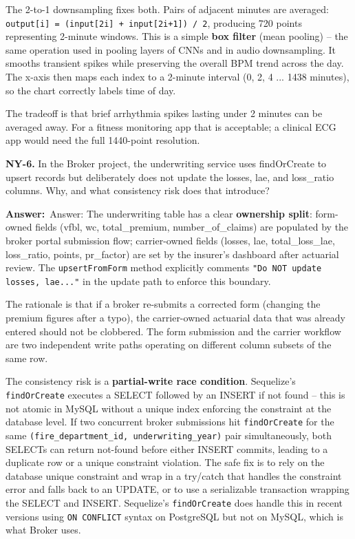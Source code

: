 \documentclass[letterpaper,10pt]{article}
\newlength{\boxwidth}
\newcommand{\answerlabel}{\noindent\textbf{\textcolor{answerblue}{Answer:}}~}
\begin{document}
The 2-to-1 downsampling fixes both. Pairs of adjacent minutes are averaged: \texttt{output[i] = (input[2i] + input[2i+1]) / 2}, producing 720 points representing 2-minute windows. This is a simple \textbf{box filter} (mean pooling) -- the same operation used in pooling layers of CNNs and in audio downsampling. It smooths transient spikes while preserving the overall BPM trend across the day. The x-axis then maps each index to a 2-minute interval (0, 2, 4 ... 1438 minutes), so the chart correctly labels time of day.

The tradeoff is that brief arrhythmia spikes lasting under 2 minutes can be averaged away. For a fitness monitoring app that is acceptable; a clinical ECG app would need the full 1440-point resolution.

\vspace{6pt}

\colorbox{qbg}{\begin{minipage}{\boxwidth}
\textbf{NY-6.} In the Broker project, the underwriting service uses findOrCreate to upsert records but deliberately does not update the losses, lae, and loss\_ratio columns. Why, and what consistency risk does that introduce?
\end{minipage}}

\vspace{2pt}
\answerlabel{Answer:} The underwriting table has a clear \textbf{ownership split}: form-owned fields (vfbl, wc, total\_premium, number\_of\_claims) are populated by the broker portal submission flow; carrier-owned fields (losses, lae, total\_loss\_lae, loss\_ratio, points, pr\_factor) are set by the insurer's dashboard after actuarial review. The \texttt{upsertFromForm} method explicitly comments \texttt{"Do NOT update losses, lae..."} in the update path to enforce this boundary.

The rationale is that if a broker re-submits a corrected form (changing the premium figures after a typo), the carrier-owned actuarial data that was already entered should not be clobbered. The form submission and the carrier workflow are two independent write paths operating on different column subsets of the same row.

The consistency risk is a \textbf{partial-write race condition}. Sequelize's \texttt{findOrCreate} executes a SELECT followed by an INSERT if not found -- this is not atomic in MySQL without a unique index enforcing the constraint at the database level. If two concurrent broker submissions hit \texttt{findOrCreate} for the same \texttt{(fire\_department\_id, underwriting\_year)} pair simultaneously, both SELECTs can return not-found before either INSERT commits, leading to a duplicate row or a unique constraint violation. The safe fix is to rely on the database unique constraint and wrap in a try/catch that handles the constraint error and falls back to an UPDATE, or to use a serializable transaction wrapping the SELECT and INSERT. Sequelize's \texttt{findOrCreate} does handle this in recent versions using \texttt{ON CONFLICT} syntax on PostgreSQL but not on MySQL, which is what Broker uses.
\end{document}
